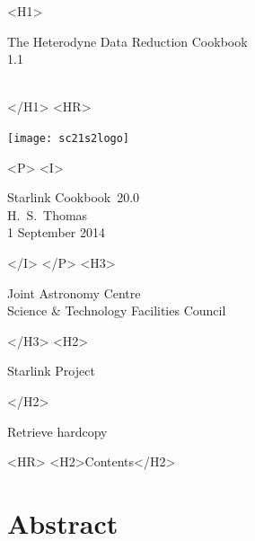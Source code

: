 \documentclass[twoside,11pt]{article}
\newcommand{\stardoccategory}  {Starlink Cookbook}
\newcommand{\stardocsource}    {sc\stardocnumber}
\newcommand{\stardocnumber}    {20.0}
\newcommand{\stardocauthors}   {H.\ S.\ Thomas}
\newcommand{\stardocdate}      {1 September 2014}
\newcommand{\stardoctitle}     {The Heterodyne Data Reduction Cookbook}
\newcommand{\stardocversion}   {1.1}
\newcommand{\stardocmanual}    {\ }
\newcommand{\htmladdnormallink}[2]{#1}
\newcommand{\htmladdimg}[1]{}
\newcommand{\htmlref}[2]{#1}
\newcommand{\htmladdtonavigation}[1]{}
\newcommand{\xlabel}[1]{}
\renewcommand{\_}{\texttt{\symbol{95}}}
\begin{document}
\begin{htmlonly}
   \xlabel{}
   \begin{rawhtml} <H1> \end{rawhtml}
      \stardoctitle\\
      \stardocversion\\
      \stardocmanual
   \begin{rawhtml} </H1> <HR> \end{rawhtml}

   \texttt{[image: sc21\_s2logo]}

   \begin{rawhtml} <P> <I> \end{rawhtml}
   \stardoccategory\ \stardocnumber \\
   \stardocauthors \\
   \stardocdate
   \begin{rawhtml} </I> </P> <H3> \end{rawhtml}
      \htmladdnormallink{Joint Astronomy Centre}
                        {http://www.jach.hawaii.edu}\\
      \htmladdnormallink{Science \& Technology Facilities Council}
                        {http://www.scitech.ac.uk} \\
   \begin{rawhtml} </H3> <H2> \end{rawhtml}
      \htmladdnormallink{Starlink Project}{http://www.starlink.ac.uk/}
   \begin{rawhtml} </H2> \end{rawhtml}
   \htmladdnormallink{\htmladdimg{source.gif} Retrieve hardcopy}
      {http://www.starlink.ac.uk/cgi-bin/hcserver?\stardocsource}\\

  \label{stardoccontents}
  \begin{rawhtml}
    <HR>
    <H2>Contents</H2>
  \end{rawhtml}
  \htmladdtonavigation{\htmlref{\htmladdimg{contents_motif.gif}}
        {stardoccontents}}

  \section{\xlabel{abstract}Abstract}
\end{htmlonly}
\end{document}
